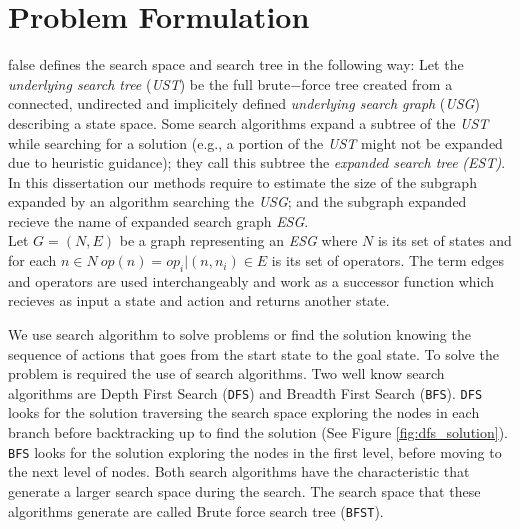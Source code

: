 \section{Problem Formulation}
\if false
\cite{lelis2013predicting} defines the search space and search tree in the following way: Let the \textit{underlying search tree} (\textit{UST}) be the full brute$-$force tree created from a connected, undirected and implicitely defined \textit{underlying search graph} (\textit{USG}) describing a state space. Some search algorithms expand a subtree of the \textit{UST} while searching for a solution (\textsf{e.g.,} a portion of the \textit{UST} might not be expanded due to heuristic guidance); they call this subtree the \textit{expanded search tree} \textit{(EST)}.\\

In this dissertation our methods require to estimate the size of the subgraph expanded by an algorithm searching the \textit{USG}; and the subgraph expanded recieve the name of expanded search graph \textit{ESG}.\\

Let $G = (N,E)$ be a graph representing an \textit{ESG} where $N$ is its set of states and for each $n \in N\  op(n) = {op_{i}|(n, n_i) \in E}$ is its set of operators. The term edges and operators are used interchangeably and work as a successor function which recieves as input a state and action and returns another state.\\
\fi

We use search algorithm to solve problems or find the solution knowing the sequence of actions that goes from the start state to the goal state. To solve the problem is required the use of search algorithms. Two well know search algorithms are Depth First Search (\texttt{DFS}) and Breadth First Search (\texttt{BFS}). \texttt{DFS} looks for the solution traversing the search space exploring the nodes in each branch before backtracking up to find the solution (See Figure \ref{fig:dfs_solution}). \texttt{BFS} looks for the solution exploring the nodes in the first level, before moving to the next level of nodes. Both search algorithms have the characteristic that generate a larger search space during the search. The search space that these algorithms generate are called Brute force search tree (\texttt{BFST}).\\


\iftrue

